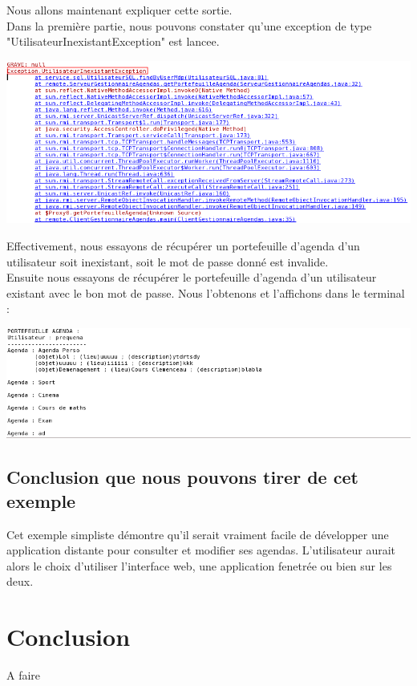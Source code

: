 \documentclass[12pt , a4paper]{article}
\begin{document}
\noindent Nous allons maintenant expliquer cette sortie.\\
Dans la première partie, nous pouvons constater qu'une exception de type "UtilisateurInexistantException" est lancee.
\begin{center}
  \includegraphics[scale=0.5]{./images/rmi-sortie01.png}
\end{center}
Effectivement, nous essayons de récupérer un portefeuille d'agenda d'un utilisateur soit inexistant, soit le mot de passe donné est invalide.\\


\noindent Ensuite nous essayons de récupérer le portefeuille d'agenda d'un utilisateur existant avec le bon mot de passe. Nous l'obtenons et l'affichons dans le terminal :
\begin{center}
  \includegraphics[scale=0.5]{./images/rmi-sortie02.png}
\end{center}

\subsection{Conclusion que nous pouvons tirer de cet exemple}
\noindent Cet exemple simpliste démontre qu'il serait vraiment facile de développer une application distante pour consulter et modifier ses agendas. L'utilisateur aurait alors le choix d'utiliser
l'interface web, une application fenetrée ou bien sur les deux.

\newpage	
\section{Conclusion}
A faire
\end{document}
